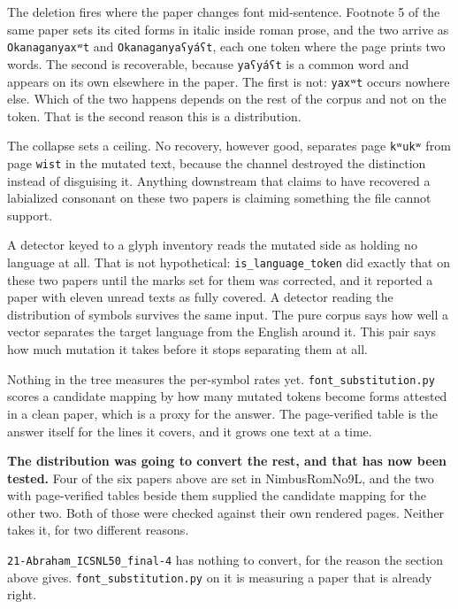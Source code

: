 The deletion fires where the paper changes font mid-sentence. Footnote 5 of the same paper sets its cited forms in italic inside roman prose, and the two arrive as \texttt{Okanaganyaxʷt} and \texttt{Okanaganyaʕyáʕt}, each one token where the page prints two words. The second is recoverable, because \texttt{yaʕyáʕt} is a common word and appears on its own elsewhere in the paper. The first is not: \texttt{yaxʷt} occurs nowhere else. Which of the two happens depends on the rest of the corpus and not on the token. That is the second reason this is a distribution.

The collapse sets a ceiling. No recovery, however good, separates page \texttt{kʷukʷ} from page \texttt{wist} in the mutated text, because the channel destroyed the distinction instead of disguising it. Anything downstream that claims to have recovered a labialized consonant on these two papers is claiming something the file cannot support.

A detector keyed to a glyph inventory reads the mutated side as holding no language at all. That is not hypothetical: \texttt{is\_\allowbreak{}language\_\allowbreak{}token} did exactly that on these two papers until the marks set for them was corrected, and it reported a paper with eleven unread texts as fully covered. A detector reading the distribution of symbols survives the same input. The pure corpus says how well a vector separates the target language from the English around it. This pair says how much mutation it takes before it stops separating them at all.

Nothing in the tree measures the per-symbol rates yet. \texttt{font\_\allowbreak{}substitution.\allowbreak{}py} scores a candidate mapping by how many mutated tokens become forms attested in a clean paper, which is a proxy for the answer. The page-verified table is the answer itself for the lines it covers, and it grows one text at a time.

\textbf{The distribution was going to convert the rest, and that has now been tested.} Four of the six papers above are set in NimbusRomNo9L, and the two with page-verified tables beside them supplied the candidate mapping for the other two. Both of those were checked against their own rendered pages. Neither takes it, for two different reasons.

\texttt{21-\allowbreak{}Abraham\_\allowbreak{}ICSNL50\_\allowbreak{}final-\allowbreak{}4} has nothing to convert, for the reason the section above gives. \texttt{font\_\allowbreak{}substitution.\allowbreak{}py} on it is measuring a paper that is already right.

